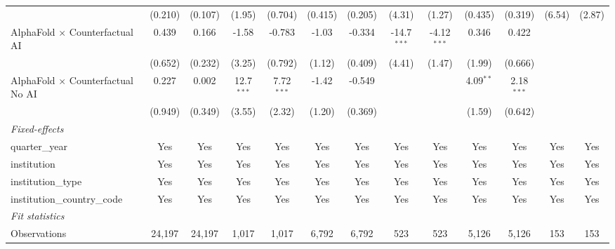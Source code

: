 \begin{tabular}{lcccccccccccc}
                                            & (0.210)      & (0.107)       & (1.95)       & (0.704)      & (0.415)      & (0.205)       & (4.31)        & (1.27)        & (0.435)     & (0.319)      & (6.54)      & (2.87)\\   
   AlphaFold $\times$ Counterfactual AI     & 0.439        & 0.166         & -1.58        & -0.783       & -1.03        & -0.334        & -14.7$^{***}$ & -4.12$^{***}$ & 0.346       & 0.422        &             &   \\   
                                            & (0.652)      & (0.232)       & (3.25)       & (0.792)      & (1.12)       & (0.409)       & (4.41)        & (1.47)        & (1.99)      & (0.666)      &             &   \\   
   AlphaFold $\times$ Counterfactual No AI  & 0.227        & 0.002         & 12.7$^{***}$ & 7.72$^{***}$ & -1.42        & -0.549        &               &               & 4.09$^{**}$ & 2.18$^{***}$ &             &   \\   
                                            & (0.949)      & (0.349)       & (3.55)       & (2.32)       & (1.20)       & (0.369)       &               &               & (1.59)      & (0.642)      &             &   \\   
   \midrule
   \emph{Fixed-effects}\\
   quarter\_year                            & Yes          & Yes           & Yes          & Yes          & Yes          & Yes           & Yes           & Yes           & Yes         & Yes          & Yes         & Yes\\  
   institution                              & Yes          & Yes           & Yes          & Yes          & Yes          & Yes           & Yes           & Yes           & Yes         & Yes          & Yes         & Yes\\  
   institution\_type                        & Yes          & Yes           & Yes          & Yes          & Yes          & Yes           & Yes           & Yes           & Yes         & Yes          & Yes         & Yes\\  
   institution\_country\_code               & Yes          & Yes           & Yes          & Yes          & Yes          & Yes           & Yes           & Yes           & Yes         & Yes          & Yes         & Yes\\  
   \midrule
   \emph{Fit statistics}\\
   Observations                             & 24,197       & 24,197        & 1,017        & 1,017        & 6,792        & 6,792         & 523           & 523           & 5,126       & 5,126        & 153         & 153\\  

\end{tabular}
